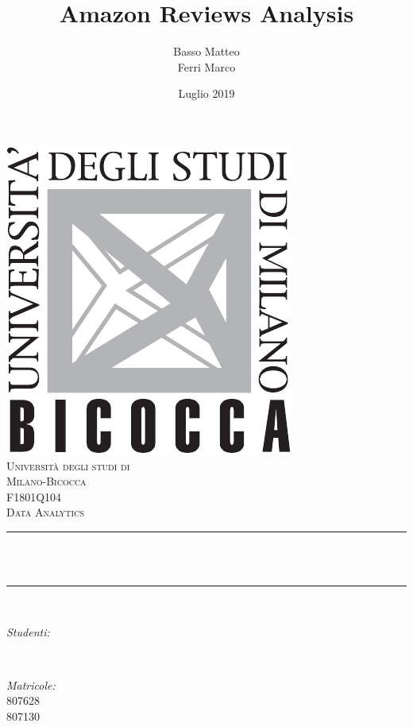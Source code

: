 \documentclass[hidelinks, 12pt]{article}
\title{Amazon Reviews Analysis}				%
\author{Basso Matteo \\ Ferri Marco}								%
\date{Luglio 2019}				%
\makeatletter
\let\thetitle\@title
\let\theauthor\@author
\let\thedate\@date
\makeatother
\begin{document}
	
	


\begin{titlepage}
	\centering
	\vspace*{0.5 cm}
	\includegraphics[scale = 0.75]{images/LogoBicocca.pdf}\\[1.0 cm]	%
	\textsc{\LARGE Università degli studi di}\\[0.2 cm]
	\textsc{\LARGE Milano-Bicocca}\\[2.0 cm]	%
	\textsc{\Large F1801Q104}\\[0.5 cm]				%
	\textsc{\large Data Analytics}				%
	\rule{\linewidth}{0.2 mm} \\[0.4 cm]
	{ \huge \bfseries \thetitle}\\
	\rule{\linewidth}{0.2 mm} \\[1.5 cm]
	
	\begin{minipage}{0.4\textwidth}
		\begin{flushleft} \large
			\emph{Studenti:}\\
			\theauthor
		\end{flushleft}
	\end{minipage}~
	\begin{minipage}{0.4\textwidth}
		\begin{flushright} \large
			\emph{Matricole:} \\
			807628 \\ 807130
		\end{flushright}
	\end{minipage}\\[2 cm]
	
	{\large \thedate}\\[2 cm]
	
	\vfill
	
\end{titlepage}
\end{document}

